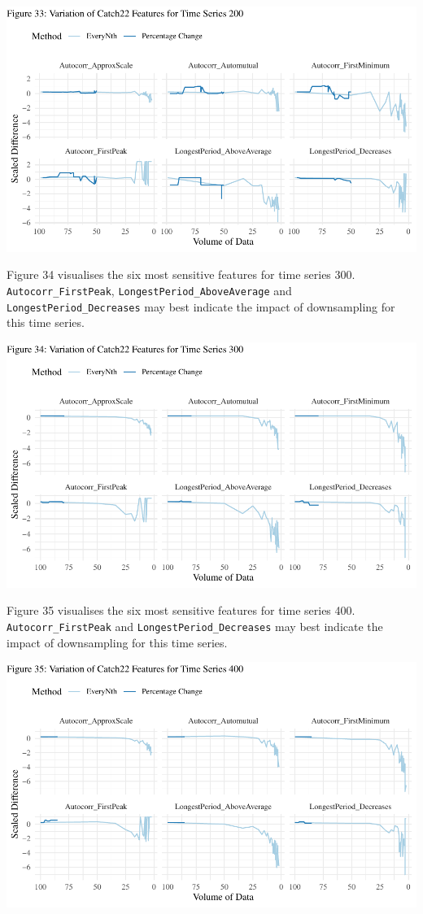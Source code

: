 \documentclass{article}
\begin{document}
\includegraphics{210431461_CSC8639_Dissertation_files/figure-latex/Catch22Variation200-1.pdf}

Figure 34 visualises the six most sensitive features for time series
300. \texttt{Autocorr\_FirstPeak}, \texttt{LongestPeriod\_AboveAverage}
and \texttt{LongestPeriod\_Decreases} may best indicate the impact of
downsampling for this time series.

\includegraphics{210431461_CSC8639_Dissertation_files/figure-latex/Catch22Variation300-1.pdf}

Figure 35 visualises the six most sensitive features for time series
400. \texttt{Autocorr\_FirstPeak} and \texttt{LongestPeriod\_Decreases}
may best indicate the impact of downsampling for this time series.

\includegraphics{210431461_CSC8639_Dissertation_files/figure-latex/Catch22Variation400-1.pdf}
\end{document}
